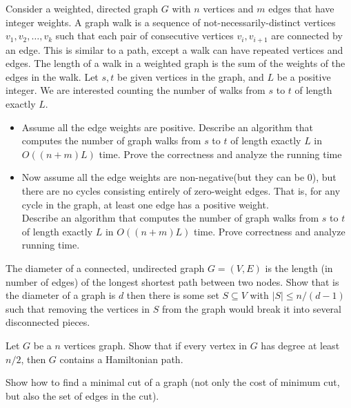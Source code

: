 \documentclass{article}
\newcounter{exercise}
\newcommand{\<}{
    \langle}
\renewcommand{\>}{
    \rangle}
\begin{document}
{\begin{exercise}
Consider a weighted, directed graph $G$ with $n$ vertices and $m$ edges that have integer weights. A graph walk is a sequence of
not-necessarily-distinct vertices $v_1,v_2,\ldots,v_k$ such that each pair of consecutive vertices $v_i,v_{i+1}$ are connected by an edge. This is similar to a path, except a walk can have repeated vertices and edges. The length of a walk in a weighted graph is the sum of the weights of the edges in the walk. Let $s,t$ be given vertices in the graph, and $L$ be a positive integer. We are interested counting the number of walks from $s$ to $t$ of length exactly $L$.
\begin{itemize}
\item Assume all the edge weights are positive. Describe an algorithm that computes the number of graph walks from $s$ to $t$ of length exactly $L$ in $O((n+m)L)$ time. Prove the correctness and analyze the running time
\item Now assume all the edge weights are non-negative(but they can be 0), but there are no cycles consisting entirely of zero-weight edges. That is, for any cycle in the graph, at least one edge has a positive weight.\\
Describe an algorithm that computes the number of graph walks from $s$ to $t$ of length exactly $L$ in $O((n+m)L)$ time. Prove correctness and analyze running time.
\end{itemize}
\end{exercise}
\newpage


\begin{exercise}
The diameter of a connected, undirected graph $G=(V,E)$ is the length (in number of edges) of the longest shortest path between two nodes. Show that is the diameter of a graph is $d$ then there is some set $S\subseteq V$ with $|S|\leq n/(d-1)$ such that removing the vertices in $S$ from the graph would break it into several disconnected pieces.

\end{exercise}



\begin{exercise}
Let $G$ be a $n$ vertices graph. Show that if every vertex in $G$ has degree at least $n/2$, then $G$ contains a Hamiltonian path.
\end{exercise}

\begin{exercise}
Show how to find a minimal cut of a graph (not only the cost of minimum cut, but also the set of edges in the cut).
\end{exercise}



}
\end{document}
